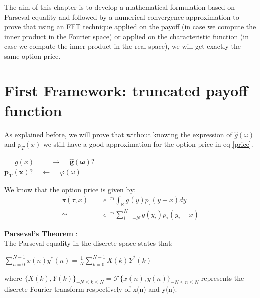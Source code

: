 \documentclass[12pt]{report}
\begin{document}
The aim of this chapter is to develop a mathematical formulation based on Parseval equality  and followed by a numerical convergence approximation to prove that using an FFT technique applied on the payoff (in case we compute the inner product in the Fourier space) or applied on the characteristic function (in case we compute the inner product in the real space), we will get exactly the same option price.\\


\newpage


\section{First Framework: truncated payoff function}

As explained before, we will prove that without knowing the expression of $\hat g (\omega)$ and $p_T(x)$ we still have a good approximation for the option price in eq \eqref{price}.

\begin{center}
 
~~~$g(x)$ ~~~~$\rightarrow$  ~  $ \mathbf{\hat g (\omega) ? }$\\
$\mathbf{{p_T}(x) ?}$ ~  $\leftarrow$ ~  $ \varphi (\omega)$
\end{center}

We know that the option price is given by:
\begin{align}
\pi(\tau,x)=& e^{-r\tau} \int_{\mathbb{R}}g(y)p_{\tau}(y-x)dy \nonumber \\
\simeq  & e^{-r\tau} \sum_{i=-N}^{N}g(y_i)p_{\tau} (y_i-x)
\label{ff}
\end{align}

\textbf{Parseval's Theorem } : \\
The Parseval equality in the discrete space states that: 
\begin{center}
\label{sum}
$\sum \limits_{n=0}^{N-1} x(n)y^*(n)= \frac{1}{N} \sum \limits_{k=0}^{N-1} X(k)Y^*(k)$
\end{center} 
where $\{X(k), Y(k)\}_{-N \leq k \leq N} = \mathcal{F} \{ x(n),y(n)\}_{-N \leq n \leq N} $ represents the discrete  Fourier transform respectively of x(n) and y(n).
\end{document}
